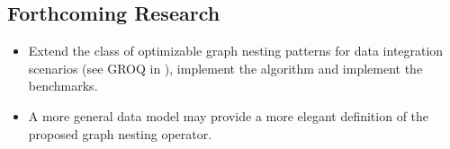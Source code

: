 \documentclass[a0,portrait]{a0poster}
\begin{document}
\begin{multicols}{2}
\color{DarkSlateGray} %


\section*{Forthcoming Research}

\begin{itemize}
	\item Extend the class of optimizable graph nesting patterns for data integration scenarios (see GROQ in \cite{Tesi}), implement the algorithm and implement the benchmarks.
	\item A more general data model may provide a more elegant definition of the proposed graph nesting operator.
\end{itemize}






\end{multicols}
\end{document}
